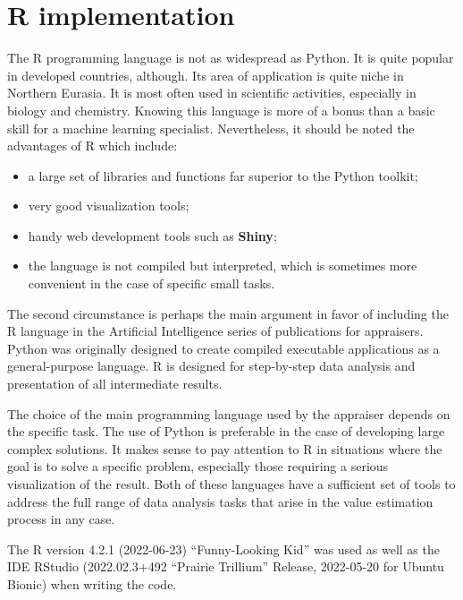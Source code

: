 \documentclass[]{scrreprt}
\begin{document}
\section{R implementation}\label{U-test-R}
%
%
The R programming language is not as widespread as Python. It is quite popular in developed countries, although. Its area of application is quite niche in Northern Eurasia. It is most often used in scientific activities, especially in biology and chemistry. Knowing this language is more of a bonus than a basic skill for a machine learning specialist. Nevertheless, it should be noted the advantages of R which include:
\begin{itemize}
	\item a large set of libraries and functions far superior to the Python toolkit;
	\item very good visualization tools;
	\item handy web development tools such as \textbf{Shiny};
	\item the language is not compiled but interpreted, which is sometimes more convenient in the case of specific small tasks.
\end{itemize}
The second circumstance is perhaps the main argument in favor of including the R language in the Artificial Intelligence series of publications for appraisers. Python was originally designed to create compiled executable applications as a general-purpose language. R is designed for step-by-step data analysis and presentation of all intermediate results.

The choice of the main programming language used by the appraiser depends on the specific task. The use of Python is preferable in the case of developing large complex solutions. It makes sense to pay attention to R in situations where the goal is to solve a specific problem, especially those requiring a serious visualization of the result. Both of these languages have a sufficient set of tools to address the full range of data analysis tasks that arise in the value estimation process in any case.

The R version 4.2.1 (2022-06-23) ``Funny-Looking Kid'' was used as well as the IDE RStudio (2022.02.3+492 ``Prairie Trillium'' Release, 2022-05-20 for Ubuntu Bionic) when writing the code.
\end{document}
